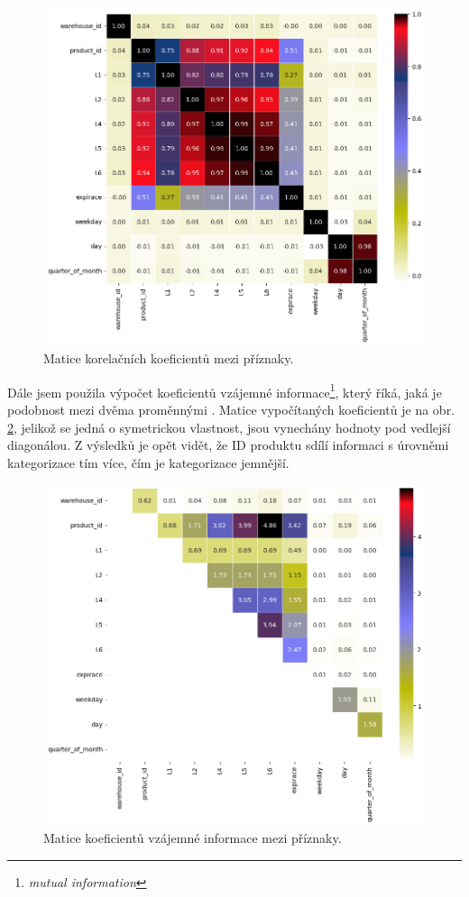 \begin{figure}[hbtp!]
    \centering
    \includegraphics[width=.8\textwidth]{obrazky/zntb/pearson.png}
    \caption{Matice korelačních koeficientů mezi příznaky.}
    \label{obr:nb:pearson}
\end{figure}

Dále jsem použila výpočet koeficientů vzájemné informace\footnote{\emph{mutual information}}, který říká, jaká je podobnost mezi dvěma proměnnými \cite{bib:scikit}. %
Matice vypočítaných koeficientů je na obr. \ref*{obr:nb:MI}, jelikož se jedná o symetrickou vlastnost, jsou vynechány hodnoty pod vedlejší diagonálou. Z výsledků je opět vidět, že ID produktu sdílí informaci s úrovněmi kategorizace tím více, čím je kategorizace jemnější.

\begin{figure}[hbtp!]
    \centering
    \includegraphics[width=.8\textwidth]{obrazky/zntb/MI.png}
    \caption{Matice koeficientů vzájemné informace mezi příznaky.}
    \label{obr:nb:MI}
\end{figure}

